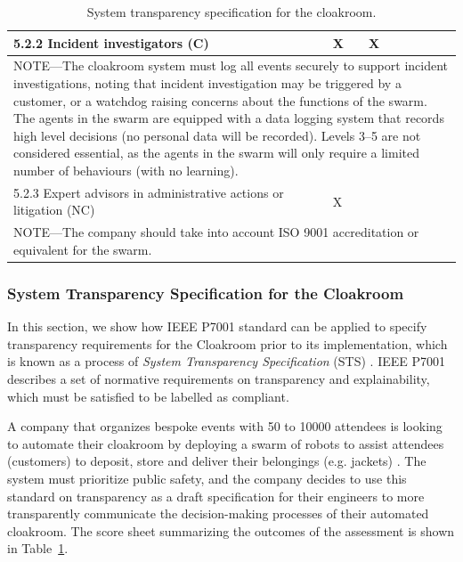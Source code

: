 \documentclass[lettersize,journal]{IEEEtran}
\begin{document}
\begin{table}
\begin{tabular}{|l| l| l| l| l| l|}
		5.2.2 Incident investigators (C) & X & X & & & \\ \hline
		\multicolumn{6}{|p{15cm}|}{NOTE—The cloakroom system must log all events securely to support incident investigations, noting that incident investigation may be triggered by a customer, or a watchdog raising concerns about the functions of the swarm. The agents in the swarm are equipped with a data logging system that records high level decisions (no personal data will be recorded). Levels 3--5 are not considered essential, as the agents in the swarm will only require a limited number of behaviours (with no learning).  }\\ \hline
		5.2.3 Expert advisors in administrative actions or litigation (NC) & X & & & & \\ \hline
		\multicolumn{6}{|p{15cm}|}{NOTE—The company should take into account ISO 9001 accreditation or equivalent for the swarm.}\\ \hline
	\end{tabular}
	\caption{\label{tab:transparency}System transparency specification for the cloakroom.}
\end{table}

\subsubsection{System Transparency Specification for the Cloakroom}
In this section, we show how IEEE P7001 standard can be applied to specify transparency requirements for the Cloakroom prior to its implementation, which is known as a process of \textit{System Transparency Specification} (STS) \cite{IEEE-P7001}. IEEE P7001 describes a set of normative requirements on transparency and explainability, which must be satisfied to be labelled as compliant. %


A company that organizes bespoke events with 50 to 10000 attendees is looking to automate their cloakroom by deploying a swarm of robots to assist attendees (customers) to deposit, store and deliver their belongings (e.g. jackets) \cite{Jones2020}. %
The system must prioritize public safety, and the company decides to use this standard on transparency as a draft specification for their engineers to more transparently communicate the decision-making processes of their automated cloakroom. %
The score sheet summarizing the outcomes of the assessment is shown in Table~\ref{tab:transparency}. \\
\end{document}
